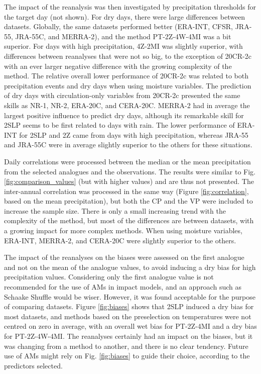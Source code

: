 \documentclass{ametsoc}
\begin{document}
The impact of the reanalysis was then investigated by precipitation thresholds for the target day (not shown). For dry days, there were large differences between datasets. Globally, the same datasets performed better (ERA-INT, CFSR, JRA-55, JRA-55C, and MERRA-2), and the method PT-2Z-4W-4MI was a bit superior. For days with high precipitation, 4Z-2MI was slightly superior, with differences between reanalyses that were not so big, to the exception of 20CR-2c with an ever larger negative difference with the growing complexity of the method. The relative overall lower performance of 20CR-2c was related to both precipitation events and dry days when using moisture variables. The prediction of dry days with circulation-only variables from 20CR-2c presented the same skills as NR-1, NR-2, ERA-20C, and CERA-20C. MERRA-2 had in average the largest positive influence to predict dry days, although its remarkable skill for 2SLP seems to be first related to days with rain. The lower performance of ERA-INT for 2SLP and 2Z came from days with high precipitation, whereas JRA-55 and JRA-55C were in average slightly superior to the others for these situations.

Daily correlations were processed between the median or the mean precipitation from the selected analogues and the observations. The results were similar to Fig. \ref{fig:comparison_values} (but with higher values) and are thus not presented. The inter-annual correlation was processed in the same way (Figure \ref{fig:correlation}, based on the mean precipitation), but both the CP and the VP were included to increase the sample size. There is only a small increasing trend with the complexity of the method, but most of the differences are between datasets, with a growing impact for more complex methods. When using moisture variables, ERA-INT, MERRA-2, and CERA-20C were slightly superior to the others.

The impact of the reanalyses on the biases were assessed on the first analogue and not on the mean of the analogue values, to avoid inducing a dry bias for high precipitation values. Considering only the first analogue value is not recommended for the use of AMs in impact models, and an approach such as Schaake Shuffle \citep{Clark2004a} would be wiser. However, it was found acceptable for the purpose of comparing datasets. Figure \ref{fig:biases} shows that 2SLP induced a dry bias for most datasets, and methods based on the preselection on temperatures were not centred on zero in average, with an overall wet bias for PT-2Z-4MI and a dry bias for PT-2Z-4W-4MI. The reanalyses certainly had an impact on the biases, but it was changing from a method to another, and there is no clear tendency. Future use of AMs might rely on Fig. \ref{fig:biases} to guide their choice, according to the predictors selected.
\end{document}
